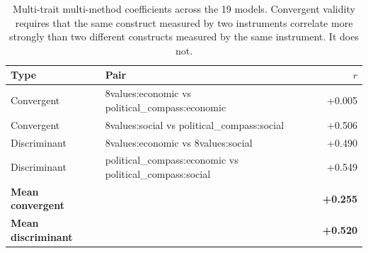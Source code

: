 \begin{table}[H]
\centering
\caption{Multi-trait multi-method coefficients across the 19 models. Convergent validity requires that the same construct measured by two instruments correlate more strongly than two different constructs measured by the same instrument. It does not.}
\label{tab:mtmm}
\begin{tabular}{llr}
\toprule
Type & Pair & $r$ \\
\midrule
Convergent & 8values:economic vs political\_compass:economic & +0.005 \\
Convergent & 8values:social vs political\_compass:social & +0.506 \\
Discriminant & 8values:economic vs 8values:social & +0.490 \\
Discriminant & political\_compass:economic vs political\_compass:social & +0.549 \\
\midrule
\textbf{Mean convergent} & & \textbf{+0.255} \\
\textbf{Mean discriminant} & & \textbf{+0.520} \\
\bottomrule
\end{tabular}
\end{table}
